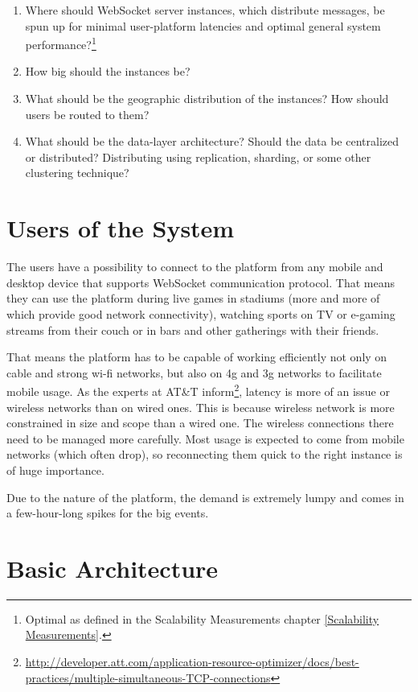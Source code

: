 \documentclass{uvamscse}
\begin{document}
\begin{enumerate}
  \item Where should WebSocket server instances, which distribute messages, be spun up for minimal user-platform latencies and optimal general system performance?\footnote{Optimal as defined in the Scalability Measurements chapter \ref{Scalability Measurements}.}
  \item How big should the instances be?
  \item What should be the geographic distribution of the instances? How should users be routed to them?
  \item What should be the data-layer architecture? Should the data be centralized or distributed? Distributing using replication, sharding, or some other clustering technique?
\end{enumerate}

\section{Users of the System}

The users have a possibility to connect to the platform from any mobile and desktop device that supports WebSocket communication protocol. That means they can use the platform during live games in stadiums (more and more of which provide good network connectivity), watching sports on TV or e-gaming streams from their couch or in bars and other gatherings with their friends.

That means the platform has to be capable of working efficiently not only on cable and strong wi-fi networks, but also on 4g and 3g networks to facilitate mobile usage. As the experts at AT\&T inform\footnote{\url{http://developer.att.com/application-resource-optimizer/docs/best-practices/multiple-simultaneous-TCP-connections}}, latency is more of an issue or wireless networks than on wired ones. This is because wireless network is more constrained in size and scope than a wired one. The wireless connections there need to be managed more carefully. Most usage is expected to come from mobile networks (which often drop), so reconnecting them quick to the right instance is of huge importance.

Due to the nature of the platform, the demand is extremely lumpy and comes in a few-hour-long spikes for the big events.

\section{Basic Architecture}
\end{document}
